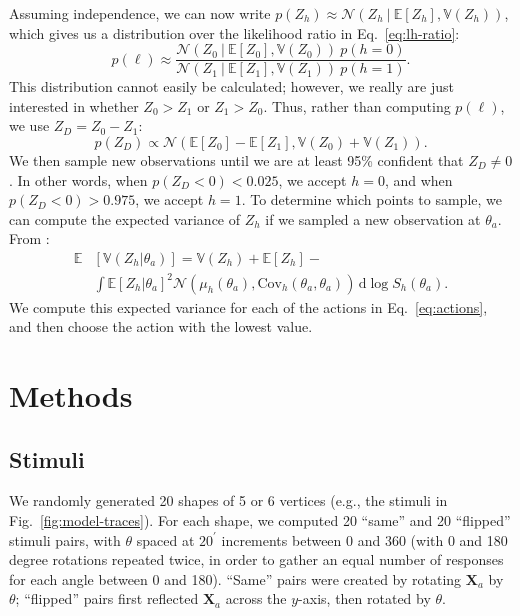 \documentclass[10pt,letterpaper]{article}
\newcommand{\Xa}[0]{\mathbf{X}_a}
\newcommand{\hi}[0]{h=0}
\newcommand{\hf}[0]{h=1}
\newcommand{\dif}[0]{\,\mathrm{d}}
\begin{document}
Assuming independence, we can now write $p(Z_h)\approx\mathcal{N}(Z_h\
\vert\ \mathbb{E}[Z_h], \mathbb{V}(Z_h))$, which gives us a
distribution over the likelihood ratio in Eq.~\ref{eq:lh-ratio}:
\begin{equation}
p(\ell)\approx\frac{\mathcal{N}(Z_0\ \vert\ \mathbb{E}[Z_0], \mathbb{V}(Z_0))\ p(\hi)}{\mathcal{N}(Z_1\ \vert\ \mathbb{E}[Z_1], \mathbb{V}(Z_1))\ p(\hf)}.
\end{equation}
This distribution cannot easily be calculated; however, we really are
just interested in whether $Z_0>Z_1$ or $Z_1>Z_0$. Thus, rather than
computing $p(\ell)$, we use $Z_D=Z_0-Z_1$:
\begin{equation}
  p(Z_D)\propto\mathcal{N}(\mathbb{E}[Z_0] - \mathbb{E}[Z_1], \mathbb{V}(Z_0) + \mathbb{V}(Z_1)).
\end{equation}
We then sample new observations until we are at least 95\% confident
that $Z_D\neq 0$. In other words, when $p(Z_D<0)<0.025$, we accept
$\hi$, and when $p(Z_D<0)>0.975$, we accept $\hf$. To determine which
points to sample, we can compute the expected variance of $Z_h$ if we
sampled a new observation at $\theta_a$. From \citeA{Osborne:2012tm}:
\begin{align}
\mathbb{E}&[\mathbb{V}(Z_h|\theta_a)]=\mathbb{V}(Z_h) + \mathbb{E}[Z_h] - \\
&\int \mathbb{E}[Z_h|\theta_{a}]^2 \mathcal{N}(\mu_h(\theta_a), \mathrm{Cov}_h(\theta_a, \theta_a))\dif\log S_h(\theta_a).\nonumber
\label{ref:expected-variance}
\end{align}
We compute this expected variance for each of the actions in
Eq.~\ref{eq:actions}, and then choose the action with the lowest
value.

\section{Methods}


\subsection{Stimuli}

We randomly generated 20 shapes of 5 or 6 vertices (e.g., the stimuli
in Fig.~\ref{fig:model-traces}). For each shape, we computed 20
``same'' and 20 ``flipped'' stimuli pairs, with $\theta$ spaced at
$20^\prime$ increments between 0 and 360 (with 0 and 180 degree
rotations repeated twice, in order to gather an equal number of
responses for each angle between 0 and 180). ``Same'' pairs were
created by rotating $\Xa$ by $\theta$; ``flipped'' pairs first
reflected $\Xa$ across the $y$-axis, then rotated by $\theta$.
\end{document}
